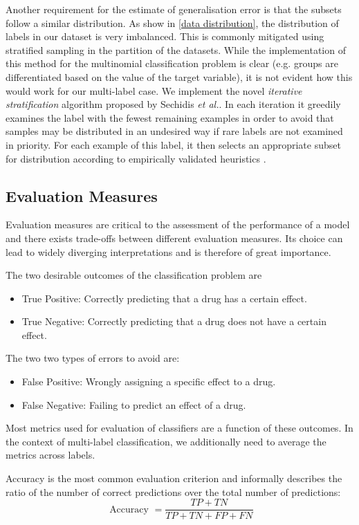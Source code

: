 \documentclass[bsc,frontabs,twoside,singlespacing,parskip,deptreport]{infthesis}     %
\let\Oldsubsection\subsection
\renewcommand{\subsection}{\FloatBarrier\Oldsubsection}
\begin{document}
Another requirement for the estimate of generalisation error is that the subsets follow a similar distribution. As show in \ref{data distribution}, the distribution of labels in our dataset is very imbalanced. This is commonly mitigated using stratified sampling in the partition of the datasets. While the implementation of this method for the multinomial classification problem is clear (e.g. groups are differentiated based on the value of the target variable), it is not evident how this would work for our multi-label case. We implement the novel \textit{iterative stratification} algorithm proposed by Sechidis \textit{et al.}. In each iteration it greedily examines the label with the fewest remaining examples in order to avoid that samples may be distributed in an undesired way if rare labels are not examined in priority. For each example of this label, it then selects an appropriate subset for distribution according to empirically validated heuristics \cite{sechidis_stratication_nodate}.
\subsection{Evaluation Measures}
Evaluation measures are critical to the assessment of the performance of a model and there exists trade-offs between different evaluation measures. Its choice can lead to widely diverging interpretations and is therefore of great importance.

The two desirable outcomes of the classification problem are 
\begin{itemize}
    \item True Positive: Correctly predicting that a drug has a certain effect.
    \item True Negative: Correctly predicting that a drug does not have a certain effect.
\end{itemize}

The two two types of errors to avoid are:
\begin{itemize}
    \item False Positive: Wrongly assigning a specific effect to a drug.
    \item False Negative: Failing to predict an effect of a drug.
\end{itemize}

Most metrics used for evaluation of classifiers are a function of these outcomes. In the context of multi-label classification, we additionally need to average the metrics across labels.

Accuracy is the most common evaluation criterion and informally describes the ratio of the number of correct predictions over the total number of predictions:
\[\text { Accuracy }=\frac{T P+T N}{T P+T N+F P+F N}\]
\end{document}
